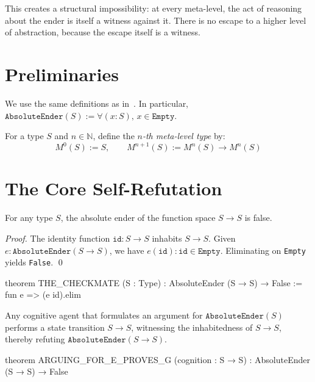 This creates a structural impossibility: at every meta-level, the act of reasoning about the ender is itself a witness against it. There is no escape to a higher level of abstraction, because the escape itself is a witness.

\section{Preliminaries}

We use the same definitions as in~\cite{upt-families}. In particular, $\texttt{AbsoluteEnder}(S) := \forall (x : S),\, x \in \texttt{Empty}$.

\begin{definition}\label{def:tower}
For a type $S$ and $n \in \mathbb{N}$, define the \emph{$n$-th meta-level type} by:
\[
M^0(S) := S, \qquad M^{n+1}(S) := M^n(S) \to M^n(S)
\]
\end{definition}

\section{The Core Self-Refutation}

\begin{theorem}\label{thm:checkmate}
For any type $S$, the absolute ender of the function space $S \to S$ is false.
\end{theorem}

\begin{proof}
The identity function $\texttt{id} : S \to S$ inhabits $S \to S$. Given $e : \texttt{AbsoluteEnder}(S \to S)$, we have $e(\texttt{id}) : \texttt{id} \in \texttt{Empty}$. Eliminating on \texttt{Empty} yields \texttt{False}. \qed
\end{proof}

\begin{leancode}
theorem THE_CHECKMATE (S : Type) :
    AbsoluteEnder (S → S) → False :=
    fun e => (e id).elim
\end{leancode}

\begin{corollary}\label{cor:arguing}
Any cognitive agent that formulates an argument for $\texttt{AbsoluteEnder}(S)$ performs a state transition $S \to S$, witnessing the inhabitedness of $S \to S$, thereby refuting $\texttt{AbsoluteEnder}(S \to S)$.
\end{corollary}

\begin{leancode}
theorem ARGUING_FOR_E_PROVES_G (cognition : S → S) :
    AbsoluteEnder (S → S) → False
\end{leancode}

